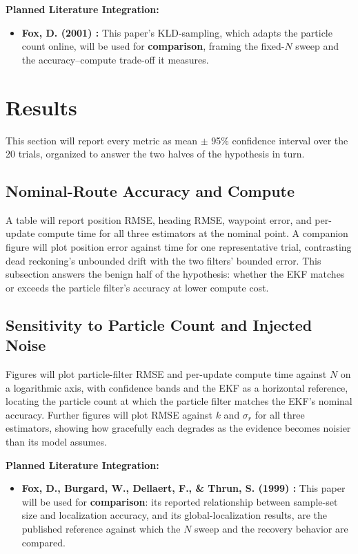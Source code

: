\documentclass[conf]{new-aiaa}
\begin{document}
\vspace{0.5em}\noindent\textbf{Planned Literature Integration:}
\begin{itemize}
    \item \textbf{Fox, D. (2001) \cite{fox2001kld}:} This paper's KLD-sampling, which adapts the particle count online, will be used for \textbf{comparison}, framing the fixed-$N$ sweep and the accuracy--compute trade-off it measures.
\end{itemize}

\section{Results}\label{sec:Results}
This section will report every metric as mean $\pm$ 95\% confidence interval over the 20 trials, organized to answer the two halves of the hypothesis in turn.

\subsection{Nominal-Route Accuracy and Compute}\label{sec:Results-Nominal}
A table will report position RMSE, heading RMSE, waypoint error, and per-update compute time for all three estimators at the nominal point. A companion figure will plot position error against time for one representative trial, contrasting dead reckoning's unbounded drift with the two filters' bounded error. This subsection answers the benign half of the hypothesis: whether the EKF matches or exceeds the particle filter's accuracy at lower compute cost.

\subsection{Sensitivity to Particle Count and Injected Noise}\label{sec:Results-Sensitivity}
Figures will plot particle-filter RMSE and per-update compute time against $N$ on a logarithmic axis, with confidence bands and the EKF as a horizontal reference, locating the particle count at which the particle filter matches the EKF's nominal accuracy. Further figures will plot RMSE against $k$ and $\sigma_r$ for all three estimators, showing how gracefully each degrades as the evidence becomes noisier than its model assumes.

\vspace{0.5em}\noindent\textbf{Planned Literature Integration:}
\begin{itemize}
    \item \textbf{Fox, D., Burgard, W., Dellaert, F., \& Thrun, S. (1999) \cite{fox1999monte}:} This paper will be used for \textbf{comparison}: its reported relationship between sample-set size and localization accuracy, and its global-localization results, are the published reference against which the $N$ sweep and the recovery behavior are compared.
\end{itemize}
\end{document}
